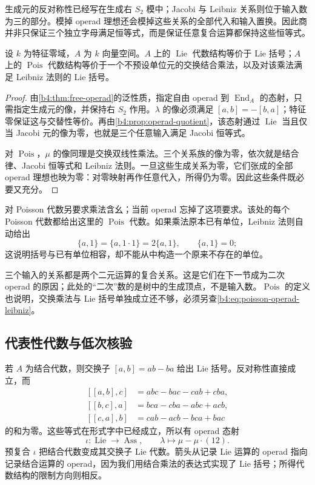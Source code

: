 生成元的反对称性已经写在生成右 \(S_2\) 模中；Jacobi 与 Leibniz 关系则位于输入数为三的部分。模掉 operad 理想还会模掉这些关系的全部代入和输入置换。因此商并非只保证三个独立字母满足恒等式，而是保证任意复合运算都保持这些恒等式。

\begin{proposition}\label{b4:prop:lie-poisson-algebras}
	设 \(k\) 为特征零域，\(A\) 为 \(k\) 向量空间。\(A\) 上的 \(\operatorname{Lie}\) 代数结构等价于 Lie 括号；\(A\) 上的 \(\operatorname{Pois}\) 代数结构等价于一个不预设单位元的交换结合乘法，以及对该乘法满足 Leibniz 法则的 Lie 括号。
\end{proposition}
\begin{proof}
	由\cref{b4:thm:free-operad}的泛性质，指定自由 operad 到 \(\operatorname{End}_A\) 的态射，只需指定生成元的像，并保持右 \(S_2\) 作用。\(\lambda\) 的像必须满足 \([a,b]=-[b,a]\)；特征零保证这与交替性等价。再由\cref{b4:prop:operad-quotient}，该态射通过 \(\operatorname{Lie}\) 当且仅当 Jacobi 元的像为零，也就是三个任意输入满足 Jacobi 恒等式。

	对 \(\operatorname{Pois}\)，\(\mu\) 的像同理是交换双线性乘法。三个关系族的像为零，依次就是结合律、Jacobi 恒等式和 Leibniz 法则。一旦这些生成关系为零，它们张成的全部 operad 理想也映为零：对零映射再作任意代入，所得仍为零。因此这些条件既必要又充分。
\end{proof}

对 Poisson 代数另要求乘法含幺；当前 operad 忘掉了这项要求。该处的每个 Poisson 代数都给出这里的 \(\operatorname{Pois}\) 代数。如果乘法原本已有单位，Leibniz 法则自动给出
\[
	\{a,1\}=\{a,1\cdot1\}=2\{a,1\},\qquad \{a,1\}=0;
\]
这说明括号与已有单位相容，却不能从中构造一个原来不存在的单位。

\ProseParagraphBreak
三个输入的关系都是两个二元运算的复合关系。这是它们在下一节成为二次 operad 的原因；此处的“二次”数的是树中的生成顶点，不是输入数。\(\operatorname{Pois}\) 的定义也说明，交换乘法与 Lie 括号单独成立还不够，必须另查\eqref{b4:eq:poisson-operad-leibniz}。

\subsection{代表性代数与低次核验}
\label{b4:subsec:G02:03}

若 \(A\) 为结合代数，则交换子 \([a,b]=ab-ba\) 给出 Lie 括号。反对称性直接成立，而
\[
	\begin{aligned}
		[[a,b],c]&=abc-bac-cab+cba,\\
		[[b,c],a]&=bca-cba-abc+acb,\\
		[[c,a],b]&=cab-acb-bca+bac
	\end{aligned}
\]
的和为零。这些等式在形式字中已经成立，所以有 operad 态射
\[
	\iota:\operatorname{Lie}\longrightarrow\operatorname{Ass},
	\qquad \lambda\longmapsto\mu-\mu\cdot(12).
\]
预复合 \(\iota\) 把结合代数变成其交换子 Lie 代数。箭头从记录 Lie 运算的 operad 指向记录结合运算的 operad，因为我们用结合乘法的表达式实现了 Lie 括号；所得代数结构的限制方向则相反。


